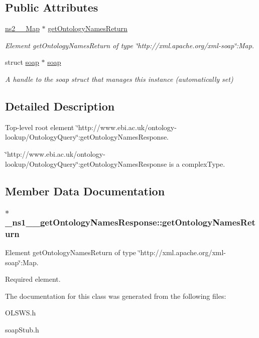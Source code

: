 \subsection*{Public Attributes}
\begin{DoxyCompactItemize}
\item 
\hyperlink{classns2____Map}{ns2\_\-\_\-Map} $\ast$ \hyperlink{class__ns1____getOntologyNamesResponse_a1a7b1b722f09cc1213ca5730950a6fa4}{getOntologyNamesReturn}
\begin{DoxyCompactList}\small\item\em Element getOntologyNamesReturn of type \char`\"{}http://xml.apache.org/xml-\/soap\char`\"{}:Map. \end{DoxyCompactList}\item 
\hypertarget{class__ns1____getOntologyNamesResponse_ac1f663bdb76648bfde2aaec84c742cc0}{
struct \hyperlink{class__ns1____getOntologyNamesResponse_ac1f663bdb76648bfde2aaec84c742cc0}{soap} $\ast$ \hyperlink{class__ns1____getOntologyNamesResponse_ac1f663bdb76648bfde2aaec84c742cc0}{soap}}
\label{class__ns1____getOntologyNamesResponse_ac1f663bdb76648bfde2aaec84c742cc0}

\begin{DoxyCompactList}\small\item\em A handle to the soap struct that manages this instance (automatically set) \end{DoxyCompactList}\end{DoxyCompactItemize}


\subsection{Detailed Description}
Top-\/level root element \char`\"{}http://www.ebi.ac.uk/ontology-\/lookup/OntologyQuery\char`\"{}:getOntologyNamesResponse. 

\char`\"{}http://www.ebi.ac.uk/ontology-\/lookup/OntologyQuery\char`\"{}:getOntologyNamesResponse is a complexType. 

\subsection{Member Data Documentation}
\hypertarget{class__ns1____getOntologyNamesResponse_a1a7b1b722f09cc1213ca5730950a6fa4}{
\subsubsection[{getOntologyNamesReturn}]{ $\ast$ {\bf \_\-ns1\_\-\_\-getOntologyNamesResponse::getOntologyNamesReturn}}}
\label{class__ns1____getOntologyNamesResponse_a1a7b1b722f09cc1213ca5730950a6fa4}


Element getOntologyNamesReturn of type \char`\"{}http://xml.apache.org/xml-\/soap\char`\"{}:Map. 

Required element. 

The documentation for this class was generated from the following files:\begin{DoxyCompactItemize}
\item 
OLSWS.h\item 
soapStub.h\end{DoxyCompactItemize}
